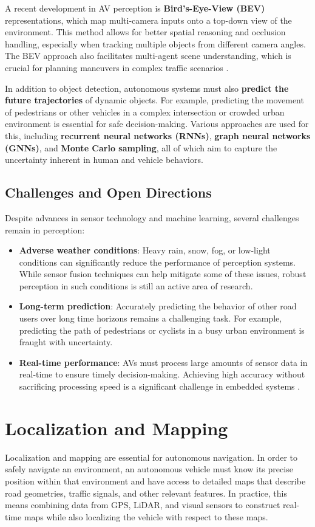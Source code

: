 \documentclass[12pt,a4paper]{article}
\begin{document}
A recent development in AV perception is \textbf{Bird’s-Eye-View (BEV)} representations, which map multi-camera inputs onto a top-down view of the environment. This method allows for better spatial reasoning and occlusion handling, especially when tracking multiple objects from different camera angles. The BEV approach also facilitates multi-agent scene understanding, which is crucial for planning maneuvers in complex traffic scenarios \cite{li2022bevformer}.

In addition to object detection, autonomous systems must also \textbf{predict the future trajectories} of dynamic objects. For example, predicting the movement of pedestrians or other vehicles in a complex intersection or crowded urban environment is essential for safe decision-making. Various approaches are used for this, including \textbf{recurrent neural networks (RNNs)}, \textbf{graph neural networks (GNNs)}, and \textbf{Monte Carlo sampling}, all of which aim to capture the uncertainty inherent in human and vehicle behaviors.

\subsection{Challenges and Open Directions}
Despite advances in sensor technology and machine learning, several challenges remain in perception:
\begin{itemize}
    \item \textbf{Adverse weather conditions}: Heavy rain, snow, fog, or low-light conditions can significantly reduce the performance of perception systems. While sensor fusion techniques can help mitigate some of these issues, robust perception in such conditions is still an active area of research.
    \item \textbf{Long-term prediction}: Accurately predicting the behavior of other road users over long time horizons remains a challenging task. For example, predicting the path of pedestrians or cyclists in a busy urban environment is fraught with uncertainty.
    \item \textbf{Real-time performance}: AVs must process large amounts of sensor data in real-time to ensure timely decision-making. Achieving high accuracy without sacrificing processing speed is a significant challenge in embedded systems \cite{huang2018apolloscape}.
\end{itemize}

\section{Localization and Mapping}
Localization and mapping are essential for autonomous navigation. In order to safely navigate an environment, an autonomous vehicle must know its precise position within that environment and have access to detailed maps that describe road geometries, traffic signals, and other relevant features. In practice, this means combining data from GPS, LiDAR, and visual sensors to construct real-time maps while also localizing the vehicle with respect to these maps.
\end{document}
